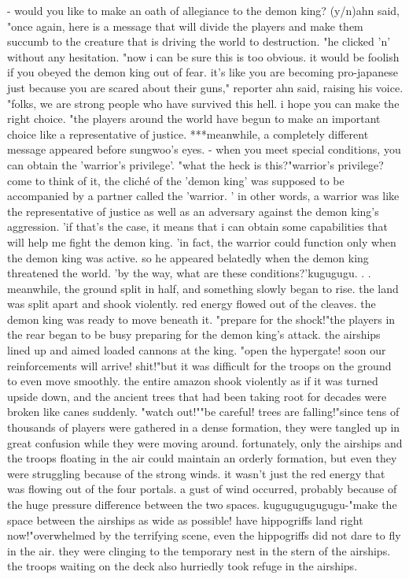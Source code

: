 - would you like to make an oath of allegiance to the demon king? (y/n)ahn said, "once again, here is a message that will divide the players and make them succumb to the creature that is driving the world to destruction.
"he clicked 'n' without any hesitation.
"now i can be sure this is too obvious.
 it would be foolish if you obeyed the demon king out of fear.
 it's like you are becoming pro-japanese just because you are scared about their guns," reporter ahn said, raising his voice.
 "folks, we are strong people who have survived this hell.
 i hope you can make the right choice.
"the players around the world have begun to make an important choice like a representative of justice.
***meanwhile, a completely different message appeared before sungwoo's eyes.
- when you meet special conditions, you can obtain the 'warrior's privilege'.
"what the heck is this?"warrior's privilege?come to think of it, the cliché of the 'demon king' was supposed to be accompanied by a partner called the 'warrior.
' in other words, a warrior was like the representative of justice as well as an adversary against the demon king's aggression.
'if that's the case, it means that i can obtain some capabilities that will help me fight the demon king.
'in fact, the warrior could function only when the demon king was active.
 so he appeared belatedly when the demon king threatened the world.
'by the way, what are these conditions?'kugugugu.
.
.
meanwhile, the ground split in half, and something slowly began to rise.
the land was split apart and shook violently.
red energy flowed out of the cleaves.
 the demon king was ready to move beneath it.
"prepare for the shock!"the players in the rear began to be busy preparing for the demon king's attack.
the airships lined up and aimed loaded cannons at the king.
"open the hypergate! soon our reinforcements will arrive! shit!"but it was difficult for the troops on the ground to even move smoothly.
the entire amazon shook violently as if it was turned upside down, and the ancient trees that had been taking root for decades were broken like canes suddenly.
"watch out!""be careful! trees are falling!"since tens of thousands of players were gathered in a dense formation, they were tangled up in great confusion while they were moving around.
fortunately, only the airships and the troops floating in the air could maintain an orderly formation, but even they were struggling because of the strong winds.
it wasn't just the red energy that was flowing out of the four portals.
 a gust of wind occurred, probably because of the huge pressure difference between the two spaces.
kugugugugugugu-"make the space between the airships as wide as possible! have hippogriffs land right now!"overwhelmed by the terrifying scene, even the hippogriffs did not dare to fly in the air.
 they were clinging to the temporary nest in the stern of the airships.
 the troops waiting on the deck also hurriedly took refuge in the airships.


